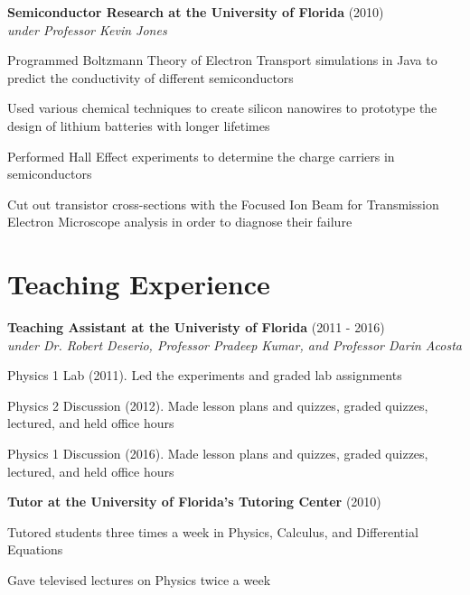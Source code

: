 \begin{resume}
    
    {\bf Semiconductor Research at the University of Florida} (2010)\\\vspace{2mm}%
    \textit{under Professor Kevin Jones}
    \begin{stuff}
        \vspace*{1mm}
                \item Programmed Boltzmann Theory of Electron Transport simulations in Java to predict the conductivity of different semiconductors
	        \item Used various chemical techniques to create silicon nanowires to prototype the design of lithium batteries with longer lifetimes
	        \item Performed Hall Effect experiments to determine the charge carriers in semiconductors
	        \item Cut out transistor cross-sections with the Focused Ion Beam for Transmission Electron Microscope analysis in order to diagnose their failure
				
    \end{stuff}

    \section{\mysidestyle Teaching Experience}

    {\bf Teaching Assistant at the Univeristy of Florida} (2011 - 2016)\\\vspace{2mm}%
    \textit{under Dr. Robert Deserio, Professor Pradeep Kumar, and Professor Darin Acosta}
    \begin{stuff}
        \vspace*{1mm}
                \item Physics 1 Lab (2011). Led the experiments and graded lab assignments
                \item Physics 2 Discussion (2012). Made lesson plans and quizzes, graded quizzes, lectured, and held office hours
                \item Physics 1 Discussion (2016). Made lesson plans and quizzes, graded quizzes, lectured, and held office hours
    \end{stuff}

    {\bf Tutor at the University of Florida's Tutoring Center} (2010)\\\vspace{-2mm}%
    \begin{stuff}
        \vspace*{1mm}
                \item Tutored students three times a week in Physics, Calculus, and Differential Equations
                \item Gave televised lectures on Physics twice a week
    \end{stuff}



\end{resume}
